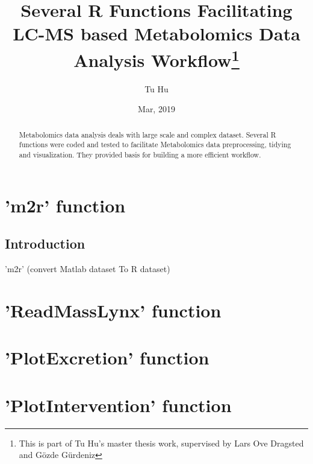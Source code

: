 \documentclass[]{article}
\title{Several R Functions Facilitating LC-MS based Metabolomics Data Analysis Workflow\footnote{This is part of Tu Hu's master thesis work, supervised by Lars Ove Dragsted and Gözde Gürdeniz}}
\author{Tu Hu}
\date{Mar, 2019}
\begin{document}
\maketitle

\begin{abstract}
Metabolomics data analysis deals with large scale and complex dataset. 
Several R functions were coded and tested to facilitate Metabolomics data preprocessing, tidying and visualization. 
They provided basis for building a more efficient workflow.
\end{abstract}

\section{'m2r' function}
\subsection{Introduction}
'm2r' (convert Matlab dataset To R dataset)

\section{'ReadMassLynx' function}

\section{'PlotExcretion' function}

\section{'PlotIntervention' function}
\end{document}
